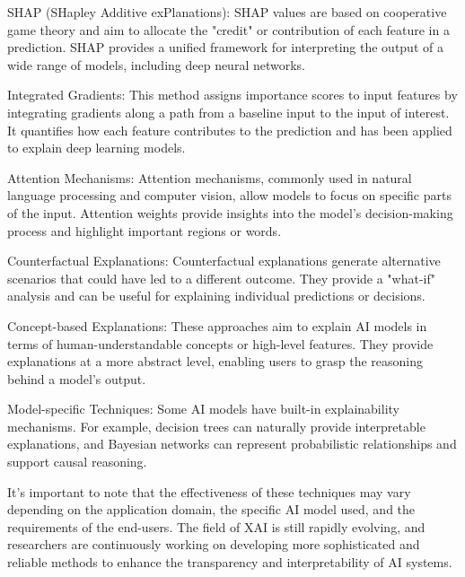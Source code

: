 SHAP (SHapley Additive exPlanations): SHAP values are based on cooperative game theory and aim to allocate the "credit" or contribution of each feature in a prediction. SHAP provides a unified framework for interpreting the output of a wide range of models, including deep neural networks.

Integrated Gradients: This method assigns importance scores to input features by integrating gradients along a path from a baseline input to the input of interest. It quantifies how each feature contributes to the prediction and has been applied to explain deep learning models.

Attention Mechanisms: Attention mechanisms, commonly used in natural language processing and computer vision, allow models to focus on specific parts of the input. Attention weights provide insights into the model's decision-making process and highlight important regions or words.

Counterfactual Explanations: Counterfactual explanations generate alternative scenarios that could have led to a different outcome. They provide a "what-if" analysis and can be useful for explaining individual predictions or decisions.

Concept-based Explanations: These approaches aim to explain AI models in terms of human-understandable concepts or high-level features. They provide explanations at a more abstract level, enabling users to grasp the reasoning behind a model's output.

Model-specific Techniques: Some AI models have built-in explainability mechanisms. For example, decision trees can naturally provide interpretable explanations, and Bayesian networks can represent probabilistic relationships and support causal reasoning.

It's important to note that the effectiveness of these techniques may vary depending on the application domain, the specific AI model used, and the requirements of the end-users. The field of XAI is still rapidly evolving, and researchers are continuously working on developing more sophisticated and reliable methods to enhance the transparency and interpretability of AI systems.